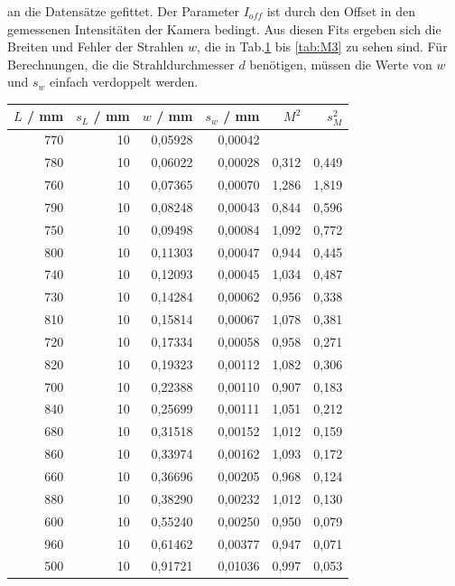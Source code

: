 an die Datensätze gefittet. Der Parameter $I_{off}$ ist durch den Offset in den gemessenen Intensitäten der Kamera bedingt. Aus diesen Fits ergeben sich die Breiten und Fehler der 
Strahlen $w$, die in Tab.\ref{tab:M} bis \ref{tab:M3} zu sehen sind. Für Berechnungen, die die Strahldurchmesser $d$ benötigen, müssen die Werte von $w$ und $s_w$ einfach verdoppelt werden.

\begin{table}
    \centering
    \begin{tabular}{rrrrrr}
        \toprule
        $L$ / mm &  $s_L$ / mm &    $w$ / mm &  $s_w$ / mm&     $M^2$ &        $s_M^2$ \\
        \midrule
        770 &  10 &  0,05928 &  0,00042 &        &        \\
        780 &  10 &  0,06022 &  0,00028 &  0,312 &  0,449 \\
        760 &  10 &  0,07365 &  0,00070 &  1,286 &  1,819 \\
        790 &  10 &  0,08248 &  0,00043 &  0,844 &  0,596 \\
        750 &  10 &  0,09498 &  0,00084 &  1,092 &  0,772 \\
        800 &  10 &  0,11303 &  0,00047 &  0,944 &  0,445 \\
        740 &  10 &  0,12093 &  0,00045 &  1,034 &  0,487 \\
        730 &  10 &  0,14284 &  0,00062 &  0,956 &  0,338 \\
        810 &  10 &  0,15814 &  0,00067 &  1,078 &  0,381 \\
        720 &  10 &  0,17334 &  0,00058 &  0,958 &  0,271 \\
        820 &  10 &  0,19323 &  0,00112 &  1,082 &  0,306 \\
        700 &  10 &  0,22388 &  0,00110 &  0,907 &  0,183 \\
        840 &  10 &  0,25699 &  0,00111 &  1,051 &  0,212 \\
        680 &  10 &  0,31518 &  0,00152 &  1,012 &  0,159 \\
        860 &  10 &  0,33974 &  0,00162 &  1,093 &  0,172\\
        660 &  10 &  0,36696 &  0,00205 &  0,968 &  0,124 \\
        880 &  10 &  0,38290 &  0,00232 &  1,012 &  0,130 \\
        600 &  10 &  0,55240 &  0,00250 &  0,950 &  0,079 \\
        960 &  10 &  0,61462 &  0,00377 &  0,947 &  0,071 \\
        500 &  10 &  0,91721 &  0,01036 &  0,997 &  0,053 \\
        \bottomrule
    \end{tabular}
    \label{tab:M}
\end{table}

